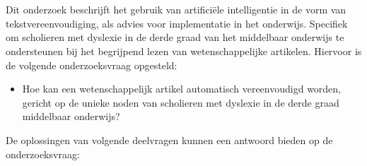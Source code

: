 \section{}%
\label{sec:onderzoeksvraag}

Dit onderzoek beschrijft het gebruik van artificiële intelligentie in de vorm van tekstvereenvoudiging, als advies voor implementatie in het onderwijs. Specifiek om scholieren met dyslexie in de derde graad van het middelbaar onderwijs te ondersteunen bij het begrijpend lezen van wetenschappelijke artikelen. Hiervoor is de volgende onderzoeksvraag opgesteld: 

\begin{itemize}
	\item Hoe kan een wetenschappelijk artikel automatisch vereenvoudigd worden, gericht op de unieke noden van scholieren met dyslexie in de derde graad middelbaar onderwijs?
\end{itemize}

De oplossingen van volgende deelvragen kunnen een antwoord bieden op de onderzoeksvraag:

